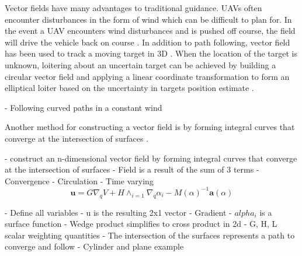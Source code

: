 \documentclass[numbered,pdftex]{ohio-etd}
\begin{document}
Vector fields have many advantages to traditional guidance. UAVs often encounter disturbances in the form of wind which can be difficult to plan for. In the event a UAV encounters wind disturbances and is pushed off course, the field will drive the vehicle back on course \cite{de_marina_guidance_2017}. In addition to path following, vector field has been used to track a moving target in 3D \cite{miao_orthogonal_2016}. When the location of the target is unknown, loitering about an uncertain target can be achieved by building a circular vector field and applying a linear coordinate transformation to form an elliptical loiter based on the uncertainty in targets position estimate \cite{frew_cooperative_2007}. 


%
%
%
%

- Following curved paths in a constant wind \cite{griffiths_vector_2006}


%
%
%

Another method for constructing a vector field is by forming integral curves that converge at the intersection of surfaces \cite{goncalves_artificial_2009}. 

- construct an n-dimensional vector field by forming integral curves that converge at the intersection of surfaces
- Field is a result of the sum of 3 terms
- Convergence
- Circulation
- Time varying\\


\begin{equation}\label{gonFieldeq}
\boldsymbol{u} = G\nabla_qV+H\wedge_{i=1}\nabla_q\alpha_i - M(\alpha)^{-1}\boldsymbol{a}(\alpha)
\end{equation}

- Define all variables
- u is the resulting 2x1 vector
- Gradient
- $alpha_i$ is a surface function
- Wedge product simplifies to cross product in 2d
- G, H, L scalar weighting quantities 
- The intersection of the surfaces represents a path to converge and follow
- Cylinder and plane example
\end{document}

